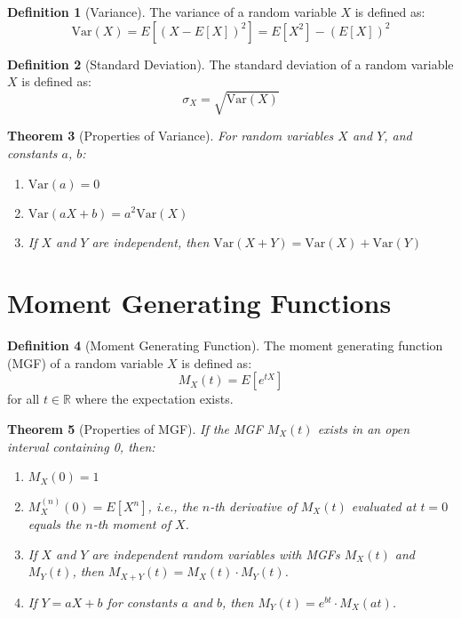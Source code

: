\documentclass[12pt,a4paper]{article}
\theoremstyle{plain}
\newtheorem{theorem}{Theorem}[section]
\theoremstyle{definition}
\newtheorem{definition}[theorem]{Definition}
\begin{document}
\begin{definition}[Variance]
The variance of a random variable $X$ is defined as:
\begin{equation}
\text{Var}(X) = E[(X - E[X])^2] = E[X^2] - (E[X])^2
\end{equation}
\end{definition}

\begin{definition}[Standard Deviation]
The standard deviation of a random variable $X$ is defined as:
\begin{equation}
\sigma_X = \sqrt{\text{Var}(X)}
\end{equation}
\end{definition}

\begin{theorem}[Properties of Variance]
For random variables $X$ and $Y$, and constants $a$, $b$:
\begin{enumerate}[label=(\roman*)]
\item $\text{Var}(a) = 0$
\item $\text{Var}(aX + b) = a^2 \text{Var}(X)$
\item If $X$ and $Y$ are independent, then $\text{Var}(X + Y) = \text{Var}(X) + \text{Var}(Y)$
\end{enumerate}
\end{theorem}

\section{Moment Generating Functions}

\begin{definition}[Moment Generating Function]
The moment generating function (MGF) of a random variable $X$ is defined as:
\begin{equation}
M_X(t) = E[e^{tX}]
\end{equation}
for all $t \in \mathbb{R}$ where the expectation exists.
\end{definition}

\begin{theorem}[Properties of MGF]
If the MGF $M_X(t)$ exists in an open interval containing 0, then:
\begin{enumerate}[label=(\roman*)]
\item $M_X(0) = 1$
\item $M_X^{(n)}(0) = E[X^n]$, i.e., the $n$-th derivative of $M_X(t)$ evaluated at $t=0$ equals the $n$-th moment of $X$.
\item If $X$ and $Y$ are independent random variables with MGFs $M_X(t)$ and $M_Y(t)$, then $M_{X+Y}(t) = M_X(t) \cdot M_Y(t)$.
\item If $Y = aX + b$ for constants $a$ and $b$, then $M_Y(t) = e^{bt} \cdot M_X(at)$.
\end{enumerate}
\end{theorem}
\end{document}

